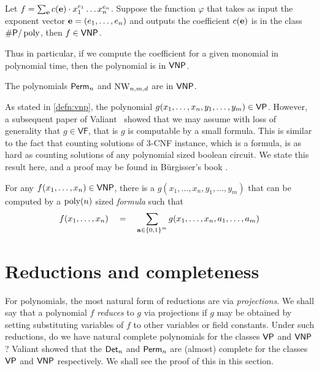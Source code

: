 \begin{theorem} \label{thm:val-criterion}
Let $f = \sum_{\mathbf{e}} c(\mathbf{e}) \cdot x_1^{e_1}\dots x_n^{e_n}$. 
Suppose the function $\varphi$ that takes as input the exponent vector $\mathbf{e} = (e_1,\dots, e_n)$ and outputs the coefficient $c(\mathbf{e})$ is in the class $\#\mathsf{P}/\operatorname{poly}$, then $f \in \mathsf{VNP}$. 
\end{theorem}

Thus in particular, if we compute the coefficient for a given monomial in polynomial time, then the polynomial is in $\mathsf{VNP}$. 

\begin{corollary}
The polynomials $\operatorname{\mathsf{Perm}}_n$ and $\operatorname{\mathrm{NW}}_{n,m,d}$ are in $\mathsf{VNP}$. 
\end{corollary}

As stated in \autoref{defn:vnp}, the polynomial $g(x_1,\dots, x_n, y_1,\dots, y_m) \in \mathsf{VP}$. 
However, a subsequent paper of Valiant~\cite{v82} showed that we may assume with loss of generality that $g \in \mathsf{VF}$, that is $g$ is computable by a small formula. 
This is similar to the fact that counting solutions of 3-\textsf{CNF} instance, which is a formula, is as hard as counting solutions of any polynomial sized boolean circuit. 
We state this result here, and a proof may be found in B\"urgisser's book \cite{bur00}. 

\begin{theorem}\label{thm:vnp-formula}
For any $f(x_1,\dots, x_n)\in \mathsf{VNP}$, there is a $g(x_1,\dots, x_n, y_1,\dots, y_m)$ that can be computed by a $\operatorname{poly}(n)$ sized \emph{formula} such that 
\[
f(x_1,\dots, x_n)\quad = \quad \sum_{\mathbf{a} \in \left\{0,1\right\}^m} g(x_1,\dots, x_n, a_1,\dots, a_m)
\]
\end{theorem}

\section{Reductions and completeness}

For polynomials, the most natural form of reductions are via \emph{projections}. 
We shall say that a polynomial $f$ \emph{reduces} to $g$ via projections if $g$ may be obtained by setting substituting variables of $f$ to other variables or field constants. 
Under such reductions, do we have natural complete polynomials for the classes $\mathsf{VP}$ and $\mathsf{VNP}$? 
Valiant \cite{v79} showed that the $\operatorname{\mathsf{Det}}_n$ and $\operatorname{\mathsf{Perm}}_n$ are (almost) complete for the classes $\mathsf{VP}$ and $\mathsf{VNP}$ respectively. 
We shall see the proof of this in this section. 


